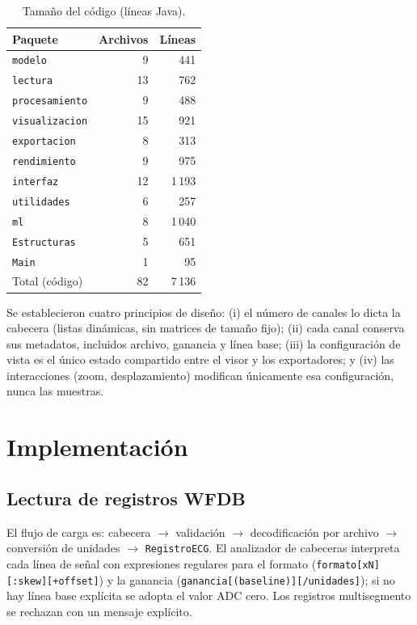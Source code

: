 \begin{table}[t]
\centering\small
\caption{Tamaño del código (líneas Java).}
\label{tab:codigo}
\begin{tabular}{@{}lrr@{}}
\toprule
Paquete & Archivos & Líneas \\
\midrule
\texttt{modelo}        & 9  & 441 \\
\texttt{lectura}       & 13 & 762 \\
\texttt{procesamiento} & 9  & 488 \\
\texttt{visualizacion} & 15 & 921 \\
\texttt{exportacion}   & 8  & 313 \\
\texttt{rendimiento}   & 9  & 975 \\
\texttt{interfaz}      & 12 & 1\,193 \\
\texttt{utilidades}    & 6  & 257 \\
\texttt{ml}   & 8  & 1\,040 \\
\texttt{Estructuras}   & 5  & 651 \\
\texttt{Main}          & 1  & 95 \\
\midrule
Total (código)         & 82 & 7\,136 \\
\bottomrule
\end{tabular}
\end{table}

Se establecieron cuatro principios de diseño: (i) el número de canales lo dicta la cabecera (listas dinámicas, sin matrices de tamaño fijo); (ii) cada canal conserva sus metadatos, incluidos archivo, ganancia y línea base; (iii) la configuración de vista es el único estado compartido entre el visor y los exportadores; y (iv) las interacciones (zoom, desplazamiento) modifican únicamente esa configuración, nunca las muestras.

\section{Implementación}
\subsection{Lectura de registros WFDB}
El flujo de carga es: cabecera $\rightarrow$ validación $\rightarrow$ decodificación por archivo $\rightarrow$ conversión de unidades $\rightarrow$ \texttt{RegistroECG}. El analizador de cabeceras interpreta cada línea de señal con expresiones regulares para el formato (\texttt{formato[xN][:skew][+offset]}) y la ganancia (\texttt{ganancia[(baseline)][/unidades]}); si no hay línea base explícita se adopta el valor ADC cero. Los registros multisegmento se rechazan con un mensaje explícito.


